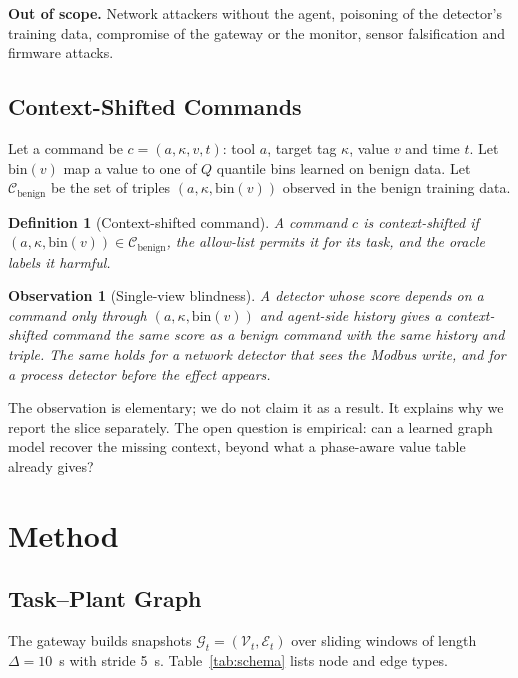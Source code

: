 \documentclass[journal]{IEEEtran}
\newtheorem{definition}{Definition}
\newtheorem{observation}{Observation}
\begin{document}
\textbf{Out of scope.} Network attackers without the agent, poisoning of the detector's training data, compromise of the gateway or the monitor, sensor falsification and firmware attacks.

\subsection{Context-Shifted Commands}
Let a command be $c=(a,\kappa,v,t)$: tool $a$, target tag $\kappa$, value $v$ and time $t$. Let $\mathrm{bin}(v)$ map a value to one of $Q$ quantile bins learned on benign data. Let $\mathcal{C}_{\text{benign}}$ be the set of triples $(a,\kappa,\mathrm{bin}(v))$ observed in the benign training data.

\begin{definition}[Context-shifted command]\label{def:cs}
A command $c$ is context-shifted if $(a,\kappa,\mathrm{bin}(v))\in\mathcal{C}_{\text{benign}}$, the allow-list permits it for its task, and the oracle labels it harmful.
\end{definition}

\begin{observation}[Single-view blindness]\label{obs:views}
A detector whose score depends on a command only through $(a,\kappa,\mathrm{bin}(v))$ and agent-side history gives a context-shifted command the same score as a benign command with the same history and triple. The same holds for a network detector that sees the Modbus write, and for a process detector before the effect appears.
\end{observation}

The observation is elementary; we do not claim it as a result. It explains why we report the slice separately. The open question is empirical: can a learned graph model recover the missing context, beyond what a phase-aware value table already gives?

\section{Method}\label{sec:method}
\subsection{Task--Plant Graph}\label{sec:graph}
The gateway builds snapshots $\mathcal{G}_t=(\mathcal{V}_t,\mathcal{E}_t)$ over sliding windows of length $\Delta=10$~s with stride 5~s. Table~\ref{tab:schema} lists node and edge types.
\end{document}
